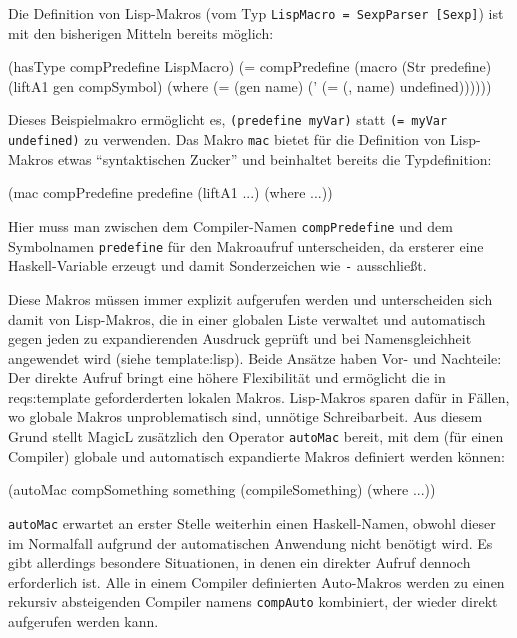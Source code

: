 \documentclass[12pt, a4paper, bibgerm]{scrbook}
\newenvironment{DIFnomarkup}{}{}
\newcommand\icode[1]{\lstinline?#1?}
\newcommand\sref{}
\newcommand{\sees}[1]{(siehe \sref{#1})}
\begin{document}
Die Definition von Lisp-Makros (vom Typ \icode{LispMacro = SexpParser [Sexp]}) ist mit
den bisherigen Mitteln bereits möglich:
\begin{DIFnomarkup}\begin{code}
(hasType compPredefine LispMacro)
(= compPredefine (macro (Str predefine)
                     (liftA1 gen compSymbol)
                   (where (= (gen name)
                             (' (= (, name) undefined))))))

\end{code}\end{DIFnomarkup}
Dieses Beispielmakro ermöglicht es, \icode{(predefine myVar)} statt
\icode{(= myVar undefined)} zu verwenden. Das Makro \icode{mac} bietet
für die Definition von Lisp-Makros etwas "`syntaktischen Zucker"' und
beinhaltet bereits die Typdefinition:
\begin{DIFnomarkup}\begin{code}
(mac compPredefine predefine
     (liftA1 ...)
   (where ...))
\end{code}\end{DIFnomarkup}
Hier muss man zwischen dem Compiler-Namen \icode{compPredefine} und dem
Symbolnamen \icode{predefine} für den Makroaufruf unterscheiden,
da ersterer eine Haskell-Variable erzeugt und damit Sonderzeichen wie
\icode{-} ausschließt.

Diese Makros müssen immer explizit aufgerufen werden und unterscheiden
sich damit von Lisp-Makros, die in einer globalen Liste verwaltet und
automatisch gegen jeden zu expandierenden Ausdruck geprüft und bei
Namensgleichheit angewendet wird \sees{template:lisp}. Beide Ansätze
haben Vor- und Nachteile: Der direkte Aufruf bringt eine höhere
Flexibilität und ermöglicht die in \sref{reqs:template} geforderderten
lokalen Makros. Lisp-Makros sparen dafür in Fällen, wo globale Makros
unproblematisch sind, unnötige Schreibarbeit. Aus diesem Grund stellt
MagicL zusätzlich den Operator \icode{autoMac} bereit, mit dem (für
einen Compiler) globale und automatisch expandierte Makros definiert
werden können:
\begin{DIFnomarkup}\begin{code}
(autoMac compSomething something
    (compileSomething)
  (where ...))
\end{code}\end{DIFnomarkup}
\icode{autoMac} erwartet an erster Stelle weiterhin einen Haskell-Namen,
obwohl dieser im Normalfall aufgrund der automatischen Anwendung nicht
benötigt wird. Es gibt allerdings besondere Situationen, in denen ein
direkter Aufruf dennoch erforderlich ist. Alle in einem Compiler
definierten Auto-Makros werden zu einen rekursiv absteigenden Compiler
namens \icode{compAuto} kombiniert, der wieder direkt aufgerufen werden
kann.
\end{document}
